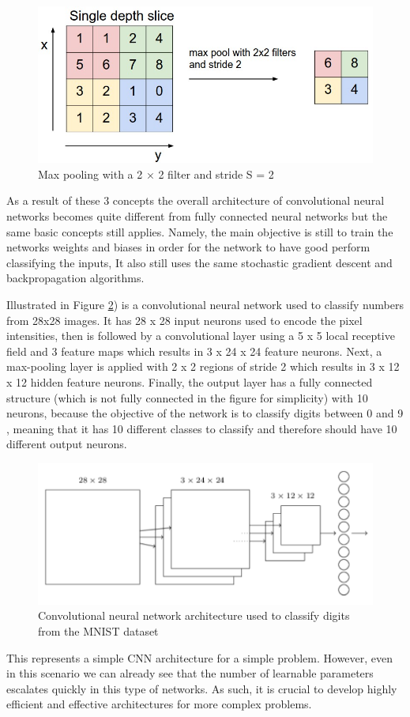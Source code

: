 \begin{itemize}
    \begin{figure}[ht]
      \centering
        \includegraphics[width=0.5\linewidth]{figs/maxpooling.png}
      \caption{Max pooling with a 2 × 2 filter and stride S = 2 \cite{Nielsen2017a}}
      \label{fig:maxpooling}
    \end{figure}
    \end{itemize}
    As a result of these 3 concepts the overall architecture of convolutional neural networks becomes quite different from fully connected neural networks but the same basic concepts still applies. Namely, the main objective is still to train the networks weights and biases in order for the network to have good perform classifying the inputs, It also still uses the same stochastic gradient descent and backpropagation algorithms. \par 
    Illustrated in Figure \ref{fig:cnn}) is a convolutional neural network used to classify numbers from 28x28 images. It has  28 x 28 input neurons used to encode the pixel intensities, then is followed by a convolutional layer using a 5 x 5 local receptive field and 3 feature maps which results in 3 x 24 x 24 feature neurons. Next, a max-pooling layer is applied with 2 x 2 regions of stride 2 which results in 3 x 12 x 12 hidden feature neurons. Finally, the output layer has a fully connected structure (which is not fully connected in the figure for simplicity) with 10 neurons, because the objective of the network is to classify digits between 0 and 9 , meaning that it has 10 different classes to classify and therefore should have 10 different output neurons. \par
    \begin{figure}[ht]
      \centering
        \includegraphics[width=0.5\linewidth]{figs/cnn.png}
      \caption{Convolutional neural network architecture used to classify digits from the MNIST dataset \cite{Nielsen2017a}}
      \label{fig:cnn}
    \end{figure}
    This represents a simple CNN architecture for a simple problem. However, even in this scenario we can already see that the number of learnable parameters escalates quickly in this type of networks. As such, it is crucial to develop highly efficient and effective architectures for more complex problems. 
    
